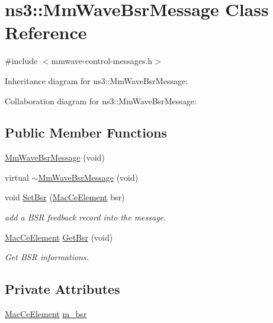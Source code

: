 \hypertarget{classns3_1_1MmWaveBsrMessage}{}\section{ns3\+:\+:Mm\+Wave\+Bsr\+Message Class Reference}
\label{classns3_1_1MmWaveBsrMessage}


{\ttfamily \#include $<$mmwave-\/control-\/messages.\+h$>$}



Inheritance diagram for ns3\+:\+:Mm\+Wave\+Bsr\+Message\+:


Collaboration diagram for ns3\+:\+:Mm\+Wave\+Bsr\+Message\+:
\subsection*{Public Member Functions}
\begin{DoxyCompactItemize}
\item 
\hyperlink{classns3_1_1MmWaveBsrMessage_afaeba0b4ca4d688a861d684f0e62f92b}{Mm\+Wave\+Bsr\+Message} (void)
\item 
virtual \hyperlink{classns3_1_1MmWaveBsrMessage_a41e1bde15b828b0a6ee243af3383d4a4}{$\sim$\+Mm\+Wave\+Bsr\+Message} (void)
\item 
void \hyperlink{classns3_1_1MmWaveBsrMessage_a9ca1dd1a54cd523575b02d92e80d6709}{Set\+Bsr} (\hyperlink{structns3_1_1MacCeElement}{Mac\+Ce\+Element} bsr)
\begin{DoxyCompactList}\small\item\em add a B\+SR feedback record into the message. \end{DoxyCompactList}\item 
\hyperlink{structns3_1_1MacCeElement}{Mac\+Ce\+Element} \hyperlink{classns3_1_1MmWaveBsrMessage_a3069c40c57d6b648dfbc19dc4c6f4646}{Get\+Bsr} (void)
\begin{DoxyCompactList}\small\item\em Get B\+SR informations. \end{DoxyCompactList}\end{DoxyCompactItemize}
\subsection*{Private Attributes}
\begin{DoxyCompactItemize}
\item 
\hyperlink{structns3_1_1MacCeElement}{Mac\+Ce\+Element} \hyperlink{classns3_1_1MmWaveBsrMessage_a889cce96841a1fb4e6bab5542154b04e}{m\+\_\+bsr}
\end{DoxyCompactItemize}
